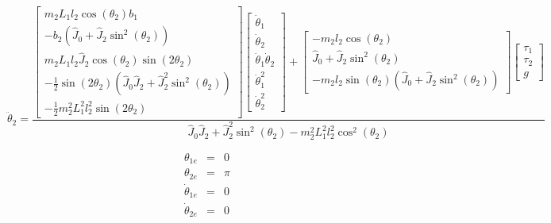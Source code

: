 \begin{equation}
\ddot{\theta}_2 =
\frac{
\begin{bmatrix}
m_2L_1l_2\cos(\theta_2)b_1 \\ 
-b_2(\hat{J}_0+\hat{J}_2\sin^2(\theta_2)) \\ 
m_2L_1l_2\hat{J}_2\cos(\theta_2)\sin(2\theta_2) \\ 
-\frac{1}{2}\sin(2\theta_2)(\hat{J}_0\hat{J}_2+\hat{J}^2_2\sin^2(\theta_2)) \\ 
-\frac{1}{2}m^2_2L^2_1l^2_2\sin(2\theta_2)
\end{bmatrix}
\begin{bmatrix}
\dot{\theta}_1 \\ 
\dot{\theta}_2 \\ 
\dot{\theta}_1\dot{\theta}_2 \\ 
\dot{\theta}^2_1 \\ 
\dot{\theta}^2_2
\end{bmatrix}
+
\begin{bmatrix}
-m_2l_2\cos(\theta_2) \\ 
\hat{J}_0+\hat{J}_2\sin^2(\theta_2) \\ 
-m_2l_2\sin(\theta_2)(\hat{J}_0+\hat{J}_2\sin^2(\theta_2))
\end{bmatrix}
\begin{bmatrix}
\tau_1 \\ 
\tau_2 \\ 
g
\end{bmatrix} }
{\hat{J}_0\hat{J}_2+\hat{J}^2_2\sin^2(\theta_2)-m^2_2L^2_1l^2_2\cos^2(\theta_2)}
\end{equation}

\begin{eqnarray}
\theta_{1e} &=& 0		\nonumber \\
\theta_{2e} &=& \pi	\nonumber \\
\dot{\theta}_{1e} &=& 0		\nonumber \\
\dot{\theta}_{2e} &=& 0	
\end{eqnarray}

